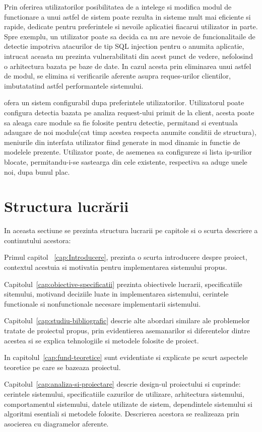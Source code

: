 Prin oferirea utilizatorilor posibilitatea de a intelege si modifica modul de functionare a unui astfel de sistem poate rezulta in sisteme mult mai eficiente si rapide, dedicate pentru preferintele si nevoile aplicatiei fiacarui utilizator in parte. Spre exemplu, un utilizator poate sa decida ca nu are nevoie de funcionalitaile de detectie impotriva atacurilor de tip SQL injection pentru o anumita aplicatie, intrucat aceasta nu prezinta vulnerabilitati din acest punct de vedere, nefolosind o arhitectura bazata pe baze de date. In cazul acesta prin eliminarea unui astfel de modul, se elimina si verificarile aferente asupra reques-urilor clientilor, imbutatatind astfel performantele sistemului.

\textit{\thesistitle} ofera un sistem configurabil dupa preferintele utilizatorilor. Utilizatorul poate configura detectia bazata pe analiza request-ului primit de la client, acesta poate sa aleaga  care module sa fie folosite pentru detectie, permitand si eventuala adaugare de noi module(cat timp acestea respecta anumite conditii de structura), meniurile din interfata utilizator fiind generate in mod dinamic in functie de modelele prezente. Utilizator poate, de asemenea sa configureze si lista ip-urilior blocate, permitandu-i-se sastearga din cele existente, respectiva sa aduge unele noi, dupa bunul plac.



 \section{Structura lucrării}
In aceasta sectiune se prezinta structura lucrarii pe capitole si o scurta descriere a continutului acestora:

Primul capitol ~\ref{cap:Introducere}, prezinta o scurta introducere despre proiect, contextul acestuia si motivatia pentru implementarea sistemului propus.

Capitolul~\ref{cap:obiective-specificatii} prezinta obiectivele lucrarii, specificatiile sitemului, motivand deciziile luate in implementarea sistemului, cerintele functionale si nonfunctionale necesare implementarii sistemului.

 Capitolul~\ref{cap:studiu-bibliografic} descrie alte abordari similare ale problemelor tratate de proiectul propus, prin evidentierea asemanarilor si diferentelor dintre acestea si se explica tehnologiile si metodele folosite de proiect.
 
In capitolul~\ref{cap:fund-teoretice} sunt evidentiate si explicate pe scurt aspectele teoretice pe care se bazeaza proiectul.

Capitolul~\ref{cap:analiza-si-proiectare} descrie design-ul proiectului si cuprinde: cerintele sistemului, specificatiile cazurilor de utilizare, arhitectura sistemului, comportamentul sistemului, datele utilizate de sistem, dependintele sistemului si algoritmi esentiali si metodele folosite. Descrierea acestora se realizeaza prin asocierea cu diagramelor aferente.
